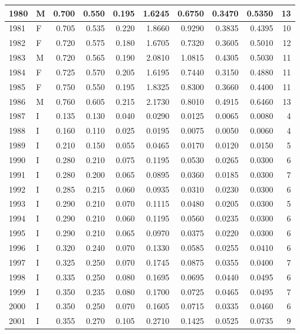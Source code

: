 \documentclass[9pt,twocolumn,twoside,]{pnas-new}
\begin{document}
\begin{tabular}{l|l|r|r|r|r|r|r|r|r}
\hline
1980 & M & 0.700 & 0.550 & 0.195 & 1.6245 & 0.6750 & 0.3470 & 0.5350 & 13\\
\hline
1981 & F & 0.705 & 0.535 & 0.220 & 1.8660 & 0.9290 & 0.3835 & 0.4395 & 10\\
\hline
1982 & F & 0.720 & 0.575 & 0.180 & 1.6705 & 0.7320 & 0.3605 & 0.5010 & 12\\
\hline
1983 & M & 0.720 & 0.565 & 0.190 & 2.0810 & 1.0815 & 0.4305 & 0.5030 & 11\\
\hline
1984 & F & 0.725 & 0.570 & 0.205 & 1.6195 & 0.7440 & 0.3150 & 0.4880 & 11\\
\hline
1985 & F & 0.750 & 0.550 & 0.195 & 1.8325 & 0.8300 & 0.3660 & 0.4400 & 11\\
\hline
1986 & M & 0.760 & 0.605 & 0.215 & 2.1730 & 0.8010 & 0.4915 & 0.6460 & 13\\
\hline
1987 & I & 0.135 & 0.130 & 0.040 & 0.0290 & 0.0125 & 0.0065 & 0.0080 & 4\\
\hline
1988 & I & 0.160 & 0.110 & 0.025 & 0.0195 & 0.0075 & 0.0050 & 0.0060 & 4\\
\hline
1989 & I & 0.210 & 0.150 & 0.055 & 0.0465 & 0.0170 & 0.0120 & 0.0150 & 5\\
\hline
1990 & I & 0.280 & 0.210 & 0.075 & 0.1195 & 0.0530 & 0.0265 & 0.0300 & 6\\
\hline
1991 & I & 0.280 & 0.200 & 0.065 & 0.0895 & 0.0360 & 0.0185 & 0.0300 & 7\\
\hline
1992 & I & 0.285 & 0.215 & 0.060 & 0.0935 & 0.0310 & 0.0230 & 0.0300 & 6\\
\hline
1993 & I & 0.290 & 0.210 & 0.070 & 0.1115 & 0.0480 & 0.0205 & 0.0300 & 5\\
\hline
1994 & I & 0.290 & 0.210 & 0.060 & 0.1195 & 0.0560 & 0.0235 & 0.0300 & 6\\
\hline
1995 & I & 0.290 & 0.210 & 0.065 & 0.0970 & 0.0375 & 0.0220 & 0.0300 & 6\\
\hline
1996 & I & 0.320 & 0.240 & 0.070 & 0.1330 & 0.0585 & 0.0255 & 0.0410 & 6\\
\hline
1997 & I & 0.325 & 0.250 & 0.070 & 0.1745 & 0.0875 & 0.0355 & 0.0400 & 7\\
\hline
1998 & I & 0.335 & 0.250 & 0.080 & 0.1695 & 0.0695 & 0.0440 & 0.0495 & 6\\
\hline
1999 & I & 0.350 & 0.235 & 0.080 & 0.1700 & 0.0725 & 0.0465 & 0.0495 & 7\\
\hline
2000 & I & 0.350 & 0.250 & 0.070 & 0.1605 & 0.0715 & 0.0335 & 0.0460 & 6\\
\hline
2001 & I & 0.355 & 0.270 & 0.105 & 0.2710 & 0.1425 & 0.0525 & 0.0735 & 9\\

\end{tabular}
\end{document}
